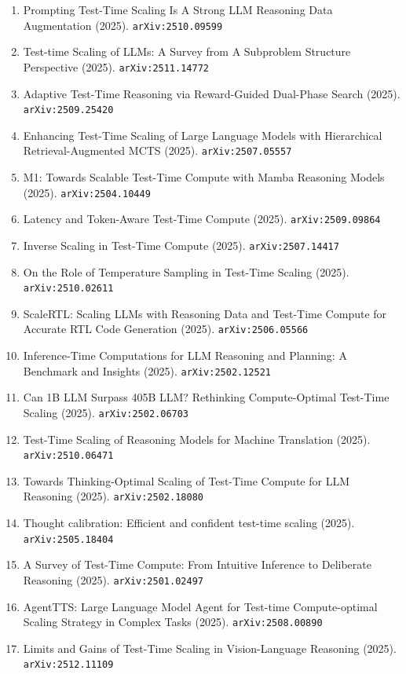 \documentclass[11pt]{article}
\begin{document}
\begin{enumerate}
  \item Prompting Test-Time Scaling Is A Strong LLM Reasoning Data Augmentation (2025). \texttt{arXiv:2510.09599}
  \item Test-time Scaling of LLMs: A Survey from A Subproblem Structure Perspective (2025). \texttt{arXiv:2511.14772}
  \item Adaptive Test-Time Reasoning via Reward-Guided Dual-Phase Search (2025). \texttt{arXiv:2509.25420}
  \item Enhancing Test-Time Scaling of Large Language Models with Hierarchical Retrieval-Augmented MCTS (2025). \texttt{arXiv:2507.05557}
  \item M1: Towards Scalable Test-Time Compute with Mamba Reasoning Models (2025). \texttt{arXiv:2504.10449}
  \item Latency and Token-Aware Test-Time Compute (2025). \texttt{arXiv:2509.09864}
  \item Inverse Scaling in Test-Time Compute (2025). \texttt{arXiv:2507.14417}
  \item On the Role of Temperature Sampling in Test-Time Scaling (2025). \texttt{arXiv:2510.02611}
  \item ScaleRTL: Scaling LLMs with Reasoning Data and Test-Time Compute for Accurate RTL Code Generation (2025). \texttt{arXiv:2506.05566}
  \item Inference-Time Computations for LLM Reasoning and Planning: A Benchmark
  and Insights (2025). \texttt{arXiv:2502.12521}
  \item Can 1B LLM Surpass 405B LLM? Rethinking Compute-Optimal Test-Time
  Scaling (2025). \texttt{arXiv:2502.06703}
  \item Test-Time Scaling of Reasoning Models for Machine Translation (2025). \texttt{arXiv:2510.06471}
  \item Towards Thinking-Optimal Scaling of Test-Time Compute for LLM Reasoning (2025). \texttt{arXiv:2502.18080}
  \item Thought calibration: Efficient and confident test-time scaling (2025). \texttt{arXiv:2505.18404}
  \item A Survey of Test-Time Compute: From Intuitive Inference to Deliberate Reasoning (2025). \texttt{arXiv:2501.02497}
  \item AgentTTS: Large Language Model Agent for Test-time Compute-optimal Scaling Strategy in Complex Tasks (2025). \texttt{arXiv:2508.00890}
  \item Limits and Gains of Test-Time Scaling in Vision-Language Reasoning (2025). \texttt{arXiv:2512.11109}

\end{enumerate}
\end{document}
